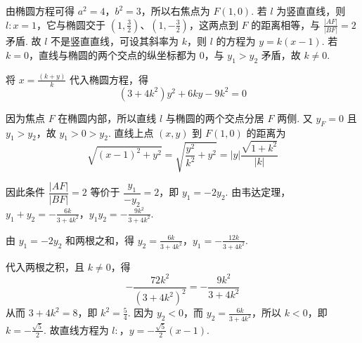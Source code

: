 \documentclass[UTF8,a4paper,oneside,11pt]{ctexbook}
\begin{document}
\begin{solution}
由椭圆方程可得 \(a^2=4\)，\(b^2=3\)，所以右焦点为 \(F(1,0)\). 若 \(l\) 为竖直直线，则 \(l:x=1\)，它与椭圆交于 \(\left(1,\frac{3}{2}\right)\)、\(\left(1,-\frac{3}{2}\right)\)，这两点到 \(F\) 的距离相等，与 \(\frac{|AF|}{|BF|}=2\) 矛盾. 故 \(l\) 不是竖直直线，可设其斜率为 \(k\)，则 \(l\) 的方程为 \(y=k(x-1)\). 若 \(k=0\)，直线与椭圆的两个交点的纵坐标都为 \(0\)，与 \(y_1>y_2\) 矛盾，故 \(k\ne0\).

将 \(x=\frac{(k+y)}{k}\) 代入椭圆方程，得
\[
(3+4k^2)y^2+6ky-9k^2=0
\]

因为焦点 \(F\) 在椭圆内部，所以直线 \(l\) 与椭圆的两个交点分居 \(F\) 两侧. 又 \(y_F=0\) 且 \(y_1>y_2\)，故 \(y_1>0>y_2\). 直线上点 \((x,y)\) 到 \(F(1,0)\) 的距离为
\[
\sqrt{(x-1)^2+y^2}=\sqrt{\frac{y^2}{k^2}+y^2}=|y|\frac{\sqrt{1+k^2}}{|k|}
\]

因此条件 \(\dfrac{|AF|}{|BF|}=2\) 等价于 \(\dfrac{y_1}{-y_2}=2\)，即 \(y_1=-2y_2\). 由韦达定理，
\(y_1+y_2=-\frac{6k}{3+4k^2}\)，\(y_1y_2=-\frac{9k^2}{3+4k^2}\).

由 \(y_1=-2y_2\) 和两根之和，得
\(y_2=\frac{6k}{3+4k^2}\)，\(y_1=-\frac{12k}{3+4k^2}\).

代入两根之积，且 \(k\ne0\)，得
\[
-\frac{72k^2}{(3+4k^2)^2}=-\frac{9k^2}{3+4k^2}
\]
从而 \(3+4k^2=8\)，即 \(k^2=\frac{5}{4}\). 因为 \(y_2<0\)，而 \(y_2=\frac{6k}{3+4k^2}\)，所以 \(k<0\)，即 \(k=-\frac{\sqrt{5}}{2}\). 故直线方程为
\(l:\)，\(y=-\frac{\sqrt{5}}{2}(x-1)\).

\end{solution}

\end{document}
